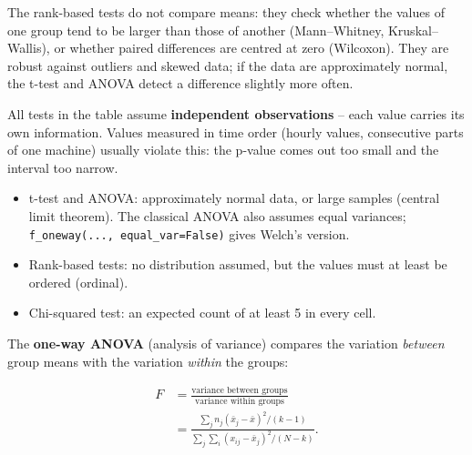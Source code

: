 \documentclass[
  letterpaper,
  DIV=11,
  numbers=noendperiod]{scrreprt}
\providecommand{\tightlist}{%
  \setlength{\itemsep}{0pt}\setlength{\parskip}{0pt}}\usepackage{longtable,booktabs,array}
\begin{document}
The rank-based tests do not compare means: they check whether the values
of one group tend to be larger than those of another (Mann--Whitney,
Kruskal--Wallis), or whether paired differences are centred at zero
(Wilcoxon). They are robust against outliers and skewed data; if the
data are approximately normal, the t-test and ANOVA detect a difference
slightly more often.

\begin{tcolorbox}[enhanced jigsaw, left=2mm, title=\textcolor{quarto-callout-warning-color}{\faExclamationTriangle}\hspace{0.5em}{Pitfall: check the assumptions}, opacityback=0, breakable, rightrule=.15mm, arc=.35mm, toptitle=1mm, colbacktitle=quarto-callout-warning-color!10!white, opacitybacktitle=0.6, coltitle=black, colframe=quarto-callout-warning-color-frame, bottomrule=.15mm, leftrule=.75mm, bottomtitle=1mm, titlerule=0mm, toprule=.15mm, colback=white]

All tests in the table assume \textbf{independent observations} -- each
value carries its own information. Values measured in time order (hourly
values, consecutive parts of one machine) usually violate this: the
p-value comes out too small and the interval too narrow.

\begin{itemize}
\tightlist
\item
  t-test and ANOVA: approximately normal data, or large samples (central
  limit theorem). The classical ANOVA also assumes equal variances;
  \texttt{f\_oneway(...,\ equal\_var=False)} gives Welch's version.
\item
  Rank-based tests: no distribution assumed, but the values must at
  least be ordered (ordinal).
\item
  Chi-squared test: an expected count of at least 5 in every cell.
\end{itemize}

\end{tcolorbox}

The \textbf{one-way ANOVA} (analysis of variance) compares the variation
\emph{between} group means with the variation \emph{within} the groups:

\[\begin{aligned} F &= \frac{\text{variance between groups}}{\text{variance within groups}} \\ &= \frac{\sum_j n_j(\bar x_j - \bar x)^2/(k-1)}{\sum_j \sum_i (x_{ij} - \bar x_j)^2/(N-k)}. \end{aligned}\]
\end{document}
